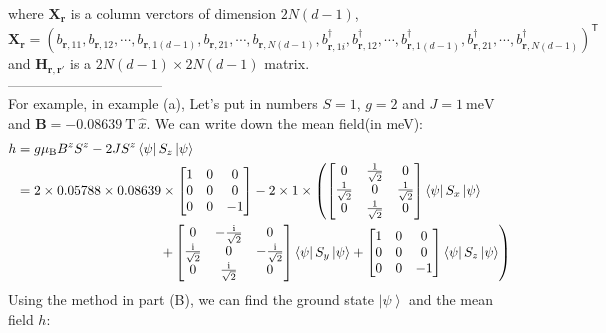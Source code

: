 \documentclass[letterpaper,10pt]{article}
\newcommand{\ii}{\mathrm{i}}
\begin{document}
 where $\mathbf{X}_{\bm{r}}$ is a column verctors of dimension $2N(d-1)$, $$\mathbf{X}_{\bm{r}}=\left(b_{\bm{r},11},b_{\bm{r},12},\cdots,b_{\bm{r},1(d-1)},b_{\bm{r},21},\cdots,b_{\bm{r},N(d-1)},b_{\bm{r},1i}^{\dagger},b_{\bm{r},12}^{\dagger},\cdots,b_{\bm{r},1(d-1)}^{\dagger},b_{\bm{r},21}^{\dagger},\cdots,b_{\bm{r},N(d-1)}^{\dagger}\right)^{\mathsf{T}}$$
and $\mathbf{H}_{\bm{r},\bm{r}'}$ is a $2N(d-1)\times 2N(d-1)$ matrix.\\
---------------------------------\\
 For example, in example (a), Let's put in numbers $S=1$, $g=2$ and $J=\SI{1}{\milli\electronvolt}$
and $\bm{B}=-\SI{0.08639}{\tesla}\ \hat{x}.$ We can write down the mean field(in meV):
$$\begin{aligned}
    h&=  g\mu_{\mathrm{B}} B^z S^z-2J S^z \left<\psi\right|S_z\left|\psi\right>\\
    & = 2\times 0.05788\times 0.08639\times  \begin{bmatrix}
        1 & 0 & 0\\
       0 &  0 & 0\\
        0& 0 & -1
        \end{bmatrix}-2\times1\times\left( \begin{bmatrix}
            0 & \frac{1}{\sqrt{2}} & 0\\
            \frac{1}{\sqrt{2}} &  0 &\frac{1}{\sqrt{2}}\\
        0& \frac{1}{\sqrt{2}}& 0
            \end{bmatrix} \left<\psi\right|S_x\left|\psi\right>\right.\\
           & {\ \ \ \ \ \ \ \ \ \ \ \ \ \ }\indent \indent\indent\indent\left.+\begin{bmatrix}
                0& -\frac{\ii}{\sqrt{2}} & 0\\
                \frac{\ii}{\sqrt{2}} &  0 & -\frac{\ii}{\sqrt{2}}\\
            0& \frac{\ii}{\sqrt{2}}&0
                \end{bmatrix} \left<\psi\right|S_y\left|\psi\right>+\begin{bmatrix}
            1 & 0 & 0\\
        0 &  0 & 0\\
        0& 0&-1
            \end{bmatrix} \left<\psi\right|S_z\left|\psi\right>\right)
\end{aligned}$$
Using the method in part (B), we can find the ground state $\left|\psi\right>$ and the mean field $h$:
\end{document}

